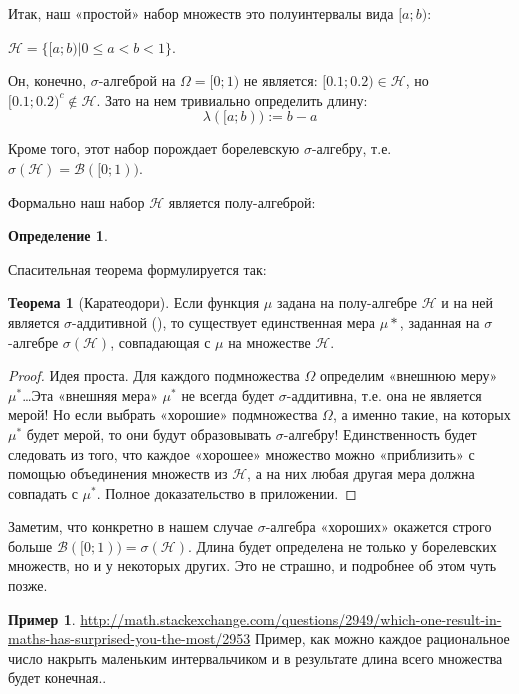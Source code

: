 \documentclass[pdftex, 12pt, a4paper]{article}
\def\B{\ensuremath{\mathcal{B}}} %
\def\s{\ensuremath{\sigma}}
\renewcommand{\leq}{\leqslant}
\theoremstyle{definition} %
\newtheorem*{mydef}{Определение}
\newtheorem{myex}{Пример}
\newtheorem{myth}{Теорема}
\numberwithin{problem}{section}
\numberwithin{blits}{section}
\begin{document}
Итак, наш «простой» набор множеств это полуинтервалы вида $[a;b)$:

$\mathcal{H}=\{[a;b)|0\leq a<b<1\}$.

Он, конечно, \s-алгеброй на $\Omega=[0;1)$ не является: $[0.1;0.2)\in \mathcal{H}$, но $[0.1;0.2)^{c}\notin\mathcal{H}$. Зато на нем тривиально определить длину:
\begin{equation}
\lambda([a;b)):=b-a
\end{equation}

Кроме того, этот набор порождает борелевскую \s-алгебру, т.е. $\s(\mathcal{H})=\B ([0;1))$.

Формально наш набор $\mathcal{H}$ является полу-алгеброй:

\begin{mydef}

\end{mydef}

Спасительная теорема формулируется так:

\begin{myth}[Каратеодори]
Если функция $\mu$ задана на полу-алгебре $\mathcal{H}$ и на ней является \s-аддитивной (), то существует единственная мера $\mu{*}$, заданная на \s-алгебре $\s(\mathcal{H})$, совпадающая с $\mu$ на множестве $\mathcal{H}$.
\end{myth}

\begin{proof} Идея проста. Для каждого подмножества $\Omega$ определим «внешнюю меру» $\mu^{*}$\ldots  Эта «внешняя мера» $\mu^{*}$ не всегда будет \s-аддитивна, т.е. она не является мерой! Но если выбрать «хорошие» подмножества $\Omega$, а именно такие, на которых $\mu^{*}$ будет мерой, то они будут образовывать \s-алгебру! Единственность будет следовать из того, что каждое «хорошее» множество можно «приблизить» с помощью объединения множеств из $\mathcal{H}$, а на них любая другая мера должна совпадать с $\mu^{*}$. Полное доказательство в приложении.
\end{proof}
Заметим, что конкретно в нашем случае \s-алгебра «хороших» окажется строго больше $\B([0;1))=\s(\mathcal{H})$. Длина будет определена не только у борелевских множеств, но и у некоторых других. Это не страшно, и подробнее об этом чуть позже.


\begin{myex}
\url{http://math.stackexchange.com/questions/2949/which-one-result-in-maths-has-surprised-you-the-most/2953}
Пример, как можно каждое рациональное число накрыть маленьким интервальчиком и в результате длина всего множества будет конечная..
\end{myex}
\end{document}
